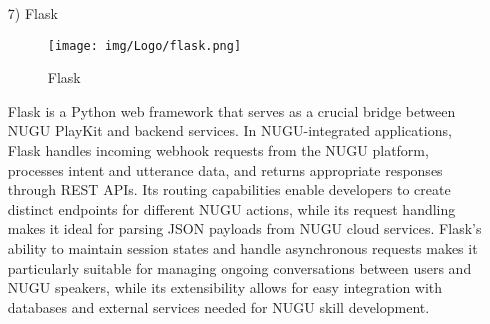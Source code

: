 \documentclass[conference]{IEEEtran}
\begin{document}
\begin{enumerate}
\begin{itemize}
        \vspace{1em}

        \item [7)] Flask\par
        \vspace{0.3em}
        \begin{figure}[h]
        \centering
        \texttt{[image: img/Logo/flask.png]}
        \centering
        \caption{Flask} 
        \end{figure}\par
        \vspace{0.3em}
        Flask is a Python web framework that serves as a crucial bridge between NUGU PlayKit and backend services. In NUGU-integrated applications, Flask handles incoming webhook requests from the NUGU platform, processes intent and utterance data, and returns appropriate responses through REST APIs. Its routing capabilities enable developers to create distinct endpoints for different NUGU actions, while its request handling makes it ideal for parsing JSON payloads from NUGU cloud services. Flask's ability to maintain session states and handle asynchronous requests makes it particularly suitable for managing ongoing conversations between users and NUGU speakers, while its extensibility allows for easy integration with databases and external services needed for NUGU skill development.
    \end{itemize}
\end{enumerate}

\vspace{1em}
\end{document}
